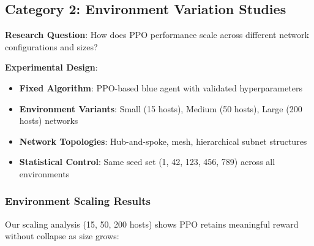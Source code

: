 \documentclass[12pt,oneside,a4paper]{article}
\theoremstyle{definition}
\theoremstyle{plain}
\begin{document}
\subsection{Category 2: Environment Variation Studies}

\textbf{Research Question}: How does PPO performance scale across different network configurations and sizes?

\textbf{Experimental Design}:
\begin{itemize}
\item \textbf{Fixed Algorithm}: PPO-based blue agent with validated hyperparameters
\item \textbf{Environment Variants}: Small (15 hosts), Medium (50 hosts), Large (200 hosts) networks
\item \textbf{Network Topologies}: Hub-and-spoke, mesh, hierarchical subnet structures
\item \textbf{Statistical Control}: Same seed set (1, 42, 123, 456, 789) across all environments
\end{itemize}

\subsubsection{Environment Scaling Results}

Our scaling analysis (15, 50, 200 hosts) shows PPO retains meaningful reward without collapse as size grows:
\end{document}
